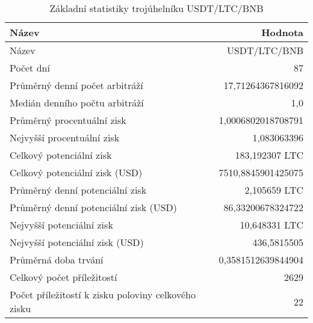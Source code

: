 \begin{table}\centering
\caption{Základní statistiky trojúhelníku USDT/LTC/BNB}
\label{USDTLTCBNB_stats}
\begin{tabular}{|| l | r ||}
\hline Název & Hodnota \\ 
\hline\hline Název & USDT/LTC/BNB \\ 
\hline Počet dní & 87 \\ 
\hline Průměrný denní počet arbitráží & 17,71264367816092 \\ 
\hline Medián denního počtu arbitráží & 1,0 \\ 
\hline Průměrný procentuální zisk & 1,0006802018708791 \\ 
\hline Nejvyšší procentuální zisk & 1,083063396 \\ 
\hline Celkový potenciální zisk & 183,192307 LTC \\ 
\hline Celkový potenciální zisk (USD) & 7510,8845901425075 \\ 
\hline Průměrný denní potenciální zisk & 2,105659 LTC \\ 
\hline Průměrný denní potenciální zisk (USD) & 86,33200678324722 \\ 
\hline Nejvyšší potenciální zisk & 10,648331 LTC \\ 
\hline Nejvyšší potenciální zisk (USD) & 436,5815505 \\ 
\hline Průměrná doba trvání & 0,3581512639844904 \\ 
\hline Celkový počet příležitostí & 2629 \\ 
\hline Počet příležitostí k zisku poloviny celkového zisku & 22 \\ 
\hline
\end{tabular}
\end{table}